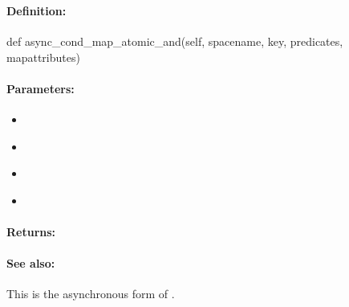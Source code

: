 \pagebreak
\subsubsection{}
\label{api:python:async_cond_map_atomic_and}


\paragraph{Definition:}
\begin{pythoncode}
def async_cond_map_atomic_and(self, spacename, key, predicates, mapattributes)
\end{pythoncode}

\paragraph{Parameters:}
\begin{itemize}[noitemsep]
\item {}\\

\item {}\\

\item {}\\

\item {}\\

\end{itemize}

\paragraph{Returns:}


\paragraph{See also:}  This is the asynchronous form of .

\pagebreak
\subsubsection{}
\label{api:python:map_atomic_or}


